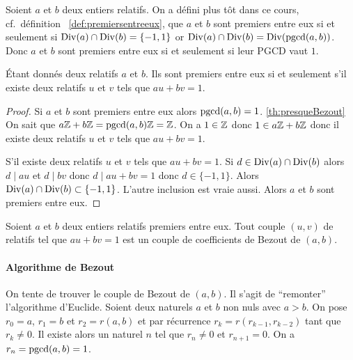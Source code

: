 Soient \(a\) et \(b\) deux entiers relatifs. On a défini plus tôt dans ce cours, cf.\ définition~
\ref{def:premiersentreeux}, que \(a\) et \(b\) sont premiers entre eux si et seulement si \(\operatorname{Div}(a) \cap \operatorname{Div}(b)=\{-1,1\}\) or \(\operatorname{Div}(a) \cap \operatorname{Div}(b) = \operatorname{Div}(\operatorname{pgcd}(a,b))\). Donc \(a\) et \(b\) sont premiers entre eux si et seulement si leur PGCD vaut \(1\).

\begin{theo}
  Étant donnés deux relatifs \(a\) et \(b\). Ils sont premiers entre eux si et seulement s'il existe deux relatifs \(u\) et \(v\) tels que \(au+bv=1\).
\end{theo}
\begin{proof}
  Si \(a\) et \(b\) sont premiers entre eux alors \(\operatorname{pgcd}(a,b) =1\). %
\ref{th:presqueBezout}
  On sait que \(a\mathbb{Z}+b\mathbb{Z}=\operatorname{pgcd}(a,b)\mathbb{Z}=\mathbb{Z}\). On a \(1 \in \mathbb{Z}\) donc \(1 \in a\mathbb{Z}+b\mathbb{Z}\) donc il existe deux relatifs \(u\) et \(v\) tels que \(au+bv=1\).

  S'il existe deux relatifs \(u\) et \(v\) tels que \(au+bv=1\). Si \(d \in \operatorname{Div}(a) \cap \operatorname{Div}(b)\) alors \(d \mid au\) et \(d \mid bv\) donc \(d \mid au+bv=1\) donc \(d \in \{-1,1\}\). Alors \(\operatorname{Div}(a) \cap \operatorname{Div}(b) \subset \{-1,1\}\). L'autre inclusion est vraie aussi. Alors \(a\) et \(b\) sont premiers entre eux.
\end{proof}

\begin{defdef}
  Soient \(a\) et \(b\) deux entiers relatifs premiers entre eux. Tout couple \((u,v)\) de relatifs tel que \(au+bv=1\) est un couple de coefficients de Bezout de \((a,b)\).
\end{defdef}

\paragraph{Algorithme de Bezout}

On tente de trouver le couple de Bezout de \((a,b)\). Il s'agit de ``remonter'' l'algorithme d'Euclide. Soient deux naturels \(a\) et \(b\) non nuls avec \(a>b\). On pose \(r_0=a\), \(r_1=b\) et \(r_2=r(a,b)\) et par récurrence \(r_k=r(r_{k-1}, r_{k-2})\) tant que \(r_k \neq 0\). Il existe alors un naturel \(n\) tel que \(r_n \neq 0\) et \(r_{n+1}=0\). On a \(r_n=\operatorname{pgcd}(a,b)=1\).

